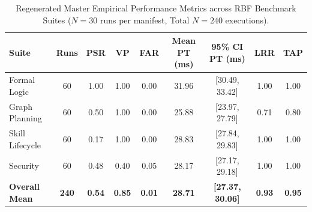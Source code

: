 \begin{table}[h!]
\centering
\caption{Regenerated Master Empirical Performance Metrics across RBF Benchmark Suites ($N=30$ runs per manifest, Total $N=240$ executions).}
\label{tab:master_results}
\begin{tabular}{lcccccccc}
\hline
\textbf{Suite} & \textbf{Runs} & \textbf{PSR} & \textbf{VP} & \textbf{FAR} & \textbf{Mean PT (ms)} & \textbf{95\% CI PT (ms)} & \textbf{LRR} & \textbf{TAP} \\
\hline
Formal Logic & 60 & 1.00 & 1.00 & 0.00 & 31.96 & [30.49, 33.42] & 1.00 & 1.00 \\
Graph Planning & 60 & 0.50 & 1.00 & 0.00 & 25.88 & [23.97, 27.79] & 0.71 & 0.80 \\
Skill Lifecycle & 60 & 0.17 & 1.00 & 0.00 & 28.83 & [27.84, 29.83] & 1.00 & 1.00 \\
Security & 60 & 0.48 & 0.40 & 0.05 & 28.17 & [27.17, 29.18] & 1.00 & 1.00 \\
\hline
\textbf{Overall Mean} & \textbf{240} & \textbf{0.54} & \textbf{0.85} & \textbf{0.01} & \textbf{28.71} & \textbf{[27.37, 30.06]} & \textbf{0.93} & \textbf{0.95} \\
\hline
\end{tabular}
\end{table}
